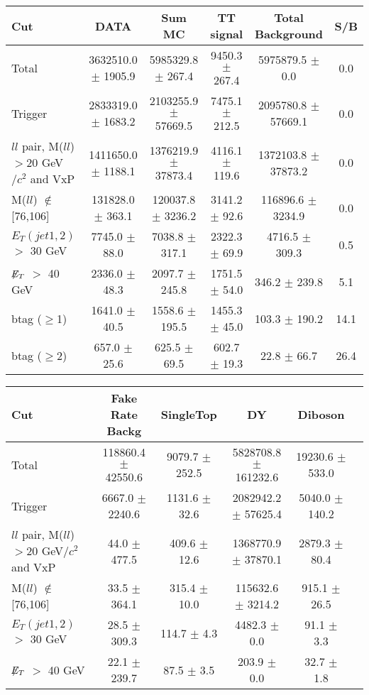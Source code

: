 \documentclass[amsmath,amssymb]{revtex4}
\begin{document}
\begin{landscape}
\begin{table}[p]
\begin{tabular}{|l|c|c|c|c|c|}
\hline
\hline
Cut & DATA & Sum MC & TT signal  & Total Background & S/B \\
\hline
Total & 3632510.0 $\pm$ 1905.9 & 5985329.8 $\pm$ 267.4 & 9450.3 $\pm$ 267.4 & 5975879.5 $\pm$ 0.0 & 0.0 \\
Trigger & 2833319.0 $\pm$ 1683.2 & 2103255.9 $\pm$ 57669.5 & 7475.1 $\pm$ 212.5 & 2095780.8 $\pm$ 57669.1 & 0.0 \\
$ll$ pair, M($ll$)$>$20 GeV$/c^2$ and VxP & 1411650.0 $\pm$ 1188.1 & 1376219.9 $\pm$ 37873.4 & 4116.1 $\pm$ 119.6 & 1372103.8 $\pm$ 37873.2 & 0.0 \\
M($ll$) $\notin$ [76,106] & 131828.0 $\pm$ 363.1 & 120037.8 $\pm$ 3236.2 & 3141.2 $\pm$ 92.6 & 116896.6 $\pm$ 3234.9 & 0.0 \\
$E_T(jet1,2)$ $>$ 30 GeV & 7745.0 $\pm$ 88.0 & 7038.8 $\pm$ 317.1 & 2322.3 $\pm$ 69.9 & 4716.5 $\pm$ 309.3 & 0.5 \\
$\not\!\!E_T$ $>$ 40 GeV & 2336.0 $\pm$ 48.3 & 2097.7 $\pm$ 245.8 & 1751.5 $\pm$ 54.0 & 346.2 $\pm$ 239.8 & 5.1 \\
btag ($\ge$1) & 1641.0 $\pm$ 40.5 & 1558.6 $\pm$ 195.5 & 1455.3 $\pm$ 45.0 & 103.3 $\pm$ 190.2 & 14.1 \\
btag ($\ge$2) & 657.0 $\pm$ 25.6 & 625.5 $\pm$ 69.5 & 602.7 $\pm$ 19.3 & 22.8 $\pm$ 66.7 & 26.4 \\
\hline
\hline
\end{tabular}
\begin{tabular}{|l|c|c|c|c|c|}
\hline
\hline
Cut & Fake Rate Backg & SingleTop & DY & Diboson  \\
\hline
Total & 118860.4 $\pm$ 42550.6 & 9079.7 $\pm$ 252.5 & 5828708.8 $\pm$ 161232.6 & 19230.6 $\pm$ 533.0 \\
Trigger & 6667.0 $\pm$ 2240.6 & 1131.6 $\pm$ 32.6 & 2082942.2 $\pm$ 57625.4 & 5040.0 $\pm$ 140.2 \\
$ll$ pair, M($ll$)$>$20 GeV$/c^2$ and VxP & 44.0 $\pm$ 477.5 & 409.6 $\pm$ 12.6 & 1368770.9 $\pm$ 37870.1 & 2879.3 $\pm$ 80.4 \\
M($ll$) $\notin$ [76,106] & 33.5 $\pm$ 364.1 & 315.4 $\pm$ 10.0 & 115632.6 $\pm$ 3214.2 & 915.1 $\pm$ 26.5 \\
$E_T(jet1,2)$ $>$ 30 GeV & 28.5 $\pm$ 309.3 & 114.7 $\pm$ 4.3 & 4482.3 $\pm$ 0.0 & 91.1 $\pm$ 3.3 \\
$\not\!\!E_T$ $>$ 40 GeV & 22.1 $\pm$ 239.7 & 87.5 $\pm$ 3.5 & 203.9 $\pm$ 0.0 & 32.7 $\pm$ 1.8 \\

\end{tabular}
\end{table}
\end{landscape}
\end{document}
